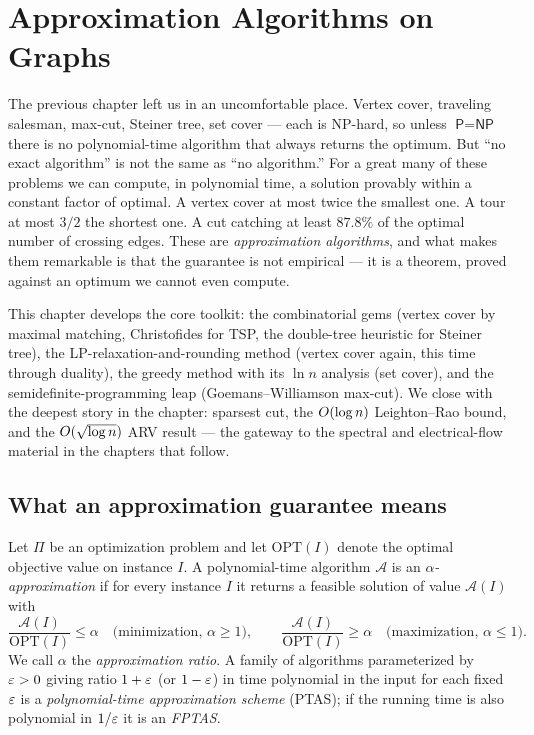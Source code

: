 \chapter{Approximation Algorithms on Graphs}

The previous chapter left us in an uncomfortable place. Vertex cover, traveling salesman,
max-cut, Steiner tree, set cover --- each is \textsf{NP}-hard, so unless $\textsf{P}=\textsf{NP}$
there is no polynomial-time algorithm that always returns the optimum. But ``no exact algorithm''
is not the same as ``no algorithm.'' For a great many of these problems we can compute, in
polynomial time, a solution provably within a constant factor of optimal. A vertex cover at most
twice the smallest one. A tour at most $3/2$ the shortest one. A cut catching at least $87.8\%$ of
the optimal number of crossing edges. These are \emph{approximation algorithms}, and what makes them
remarkable is that the guarantee is not empirical --- it is a theorem, proved against an optimum we
cannot even compute.

This chapter develops the core toolkit: the combinatorial gems (vertex cover by maximal matching,
Christofides for TSP, the double-tree heuristic for Steiner tree), the LP-relaxation-and-rounding
method (vertex cover again, this time through duality), the greedy method with its $\ln n$ analysis
(set cover), and the semidefinite-programming leap (Goemans--Williamson max-cut). We close with the
deepest story in the chapter: sparsest cut, the $O(\log n)$ Leighton--Rao bound, and the
$O(\sqrt{\log n})$ ARV result --- the gateway to the spectral and electrical-flow material in the
chapters that follow.

\chapterline

\section{What an approximation guarantee means}

\begin{definition}\label{ch38:def-ratio}
Let $\Pi$ be an optimization problem and let $\mathrm{OPT}(I)$ denote the optimal objective value on
instance $I$. A polynomial-time algorithm $\mathcal{A}$ is an \emph{$\alpha$-approximation} if for
every instance $I$ it returns a feasible solution of value $\mathcal{A}(I)$ with
\[
  \frac{\mathcal{A}(I)}{\mathrm{OPT}(I)} \le \alpha \quad\text{(minimization, } \alpha\ge 1\text{)},
  \qquad
  \frac{\mathcal{A}(I)}{\mathrm{OPT}(I)} \ge \alpha \quad\text{(maximization, } \alpha\le 1\text{)}.
\]
We call $\alpha$ the \emph{approximation ratio}. A family of algorithms parameterized by $\varepsilon>0$
giving ratio $1+\varepsilon$ (or $1-\varepsilon$) in time polynomial in the input for each fixed $\varepsilon$ is a
\emph{polynomial-time approximation scheme} (PTAS); if the running time is also polynomial in
$1/\varepsilon$ it is an \emph{FPTAS}.
\end{definition}

